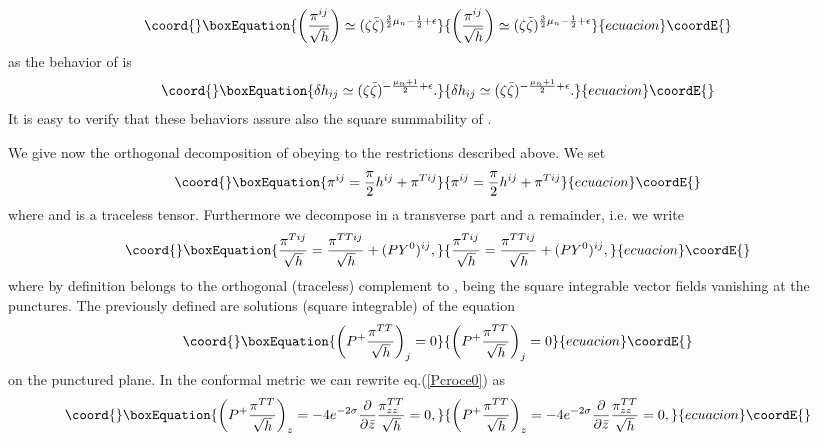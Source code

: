 \documentclass[a4paper,12pt]{article}
\begin{document}
\begin{equation}\coord{}\boxEquation{
\left(\frac{\pi^{ij} }{\sqrt h}\right) \simeq 
(\zeta \bar \zeta)^{\frac{3}{2}\mu_n -\frac{1}{2}+\epsilon}
}{
\left(\frac{\pi^{ij} }{\sqrt h}\right) \simeq 
(\zeta \bar \zeta)^{\frac{3}{2}\mu_n -\frac{1}{2}+\epsilon}
}{ecuacion}\coordE{}\end{equation}
as the behavior of \coordHE{} is
\begin{equation}\coord{}\boxEquation{
\delta h_{ij} \simeq (\zeta \bar \zeta)^{-\frac{\mu_n+1}{2} +\epsilon}.
}{
\delta h_{ij} \simeq (\zeta \bar \zeta)^{-\frac{\mu_n+1}{2} +\epsilon}.
}{ecuacion}\coordE{}\end{equation}
It is easy to verify that these behaviors assure also the square
summability of \coordHE{}.

We give now the orthogonal decomposition of \coordHE{} obeying to the
restrictions described above. We set
\begin{equation}\coord{}\boxEquation{
\pi^{ij} = \frac{\pi}{2} h^{ij} + \pi^{T ij}
}{
\pi^{ij} = \frac{\pi}{2} h^{ij} + \pi^{T ij}
}{ecuacion}\coordE{}\end{equation}
where \coordHE{} and \coordHE{} is a
traceless tensor. Furthermore we decompose \coordHE{} in a
transverse part and a remainder, i.e. we write
\begin{equation}\coord{}\boxEquation{
\frac{\pi^{Tij}}{\sqrt h} =\frac{\pi^{TTij} }{\sqrt h} + (PY^0)^{ij},
}{
\frac{\pi^{Tij}}{\sqrt h} =\frac{\pi^{TTij} }{\sqrt h} + (PY^0)^{ij},
}{ecuacion}\coordE{}\end{equation}
where by definition \coordHE{} belongs to the orthogonal (traceless)
complement to \coordHE{}, being \coordHE{} the square integrable vector
fields vanishing at the punctures. The previously defined \coordHE{}
are solutions (square integrable) of the equation
\begin{equation}\coord{}\boxEquation{\label{Pcroce0}
\left(P^+\frac{\pi^{TT}}{\sqrt h} \right)_j =0
}{\left(P^+\frac{\pi^{TT}}{\sqrt h} \right)_j =0
}{ecuacion}\coordE{}\end{equation}
on the punctured plane. In the conformal metric we can rewrite 
eq.(\ref{Pcroce0}) as
\begin{equation}\coord{}\boxEquation{
\left(P^+\frac{\pi^{TT}}{\sqrt h} \right)_z =
-4 e^{-2\sigma}\frac{\partial}{\partial \bar z} \frac{\pi^{TT}_{zz}
}{\sqrt h} =0,
}{
\left(P^+\frac{\pi^{TT}}{\sqrt h} \right)_z =
-4 e^{-2\sigma}\frac{\partial}{\partial \bar z} \frac{\pi^{TT}_{zz}
}{\sqrt h} =0,
}{ecuacion}\coordE{}\end{equation}
\end{document}
